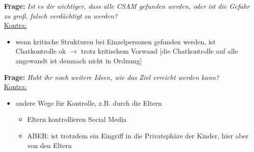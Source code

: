 \noindent \textbf{Frage:} \textit{Ist es dir wichtiger, dass alle CSAM gefunden werden, oder ist die Gefahr zu groß, falsch verdächtigt zu werden?}\\
\underline{Kontra:}
\begin{itemize}
    \item wenn kritische Strukturen bei Einzelpersonen gefunden werden, ist Chatkontrolle ok $\rightarrow$ trotz kritischem Vorwand [die Chatkontrolle auf alle angewandt ist demnach nicht in Ordnung]
\end{itemize}


\noindent \textbf{Frage:} \textit{Habt ihr noch weitere Ideen, wie das Ziel erreicht werden kann?}\\
\underline{Kontra:}
\begin{itemize}
    \item andere Wege für Kontrolle, z.B. durch die Eltern
    \begin{itemize}
        \item Eltern kontrollieren Social Media
        \item ABER: ist trotzdem ein Eingriff in die Privatsphäre der Kinder, hier aber von den Eltern
    \end{itemize}
\end{itemize}
